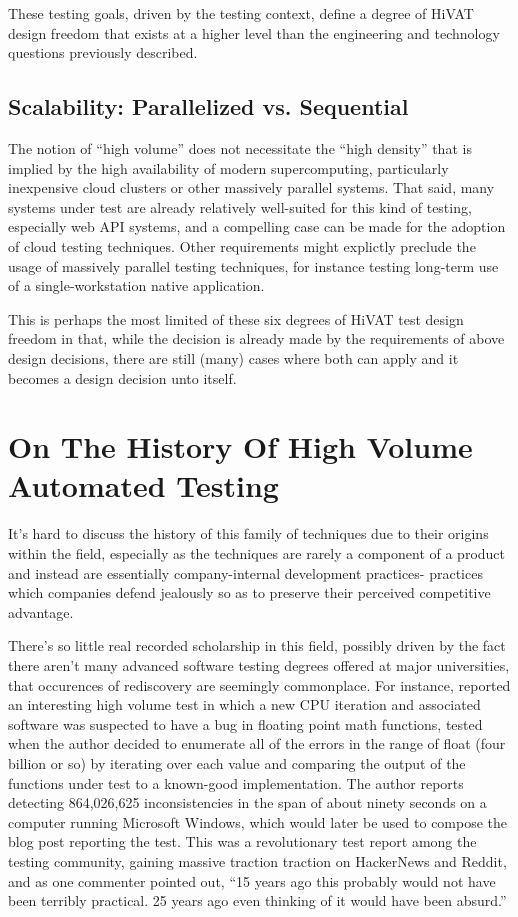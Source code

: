 These testing goals, driven by the testing context, define a degree of HiVAT design freedom that exists at a higher level than the engineering and technology questions previously described.

\subsection{Scalability: Parallelized vs. Sequential}
The notion of ``high volume'' does not necessitate the ``high density'' that is implied by the high availability of modern supercomputing, particularly inexpensive cloud clusters or other massively parallel systems. That said, many systems under test are already relatively well-suited for this kind of testing, especially web API systems, and a compelling case can be made for the adoption of cloud testing techniques.\citep{parveen2010migrate} Other requirements might explictly preclude the usage of massively parallel testing techniques, for instance testing long-term use of a single-workstation native application.

This is perhaps the most limited of these six degrees of HiVAT test design freedom in that, while the decision is already made by the requirements of above design decisions, there are still (many) cases where both can apply and it becomes a design decision unto itself.

\section{On The History Of High Volume Automated Testing}
It's hard to discuss the history of this family of techniques due to their origins within the field, especially as the techniques are rarely a component of a product and instead are essentially company-internal development practices- practices which companies defend jealously so as to preserve their perceived competitive advantage.

There's so little real recorded scholarship in this field, possibly driven by the fact there aren't many advanced software testing degrees offered at major universities, that occurences of rediscovery are seemingly commonplace. For instance, \citet{dawsonFourBillion} reported an interesting high volume test in which a new CPU iteration and associated software was suspected to have a bug in floating point math functions, tested when the author decided to enumerate all of the errors in the range of float (four billion or so) by iterating over each value and comparing the output of the functions under test to a known-good implementation. The author reports detecting 864,026,625 inconsistencies in the span of about ninety seconds on a computer running Microsoft Windows, which would later be used to compose the blog post reporting the test. This was a revolutionary test report among the testing community, gaining massive traction traction on HackerNews and Reddit, and as one commenter pointed out, ``15 years ago this probably would not have been terribly practical. 25 years ago even thinking of it would have been absurd.''

